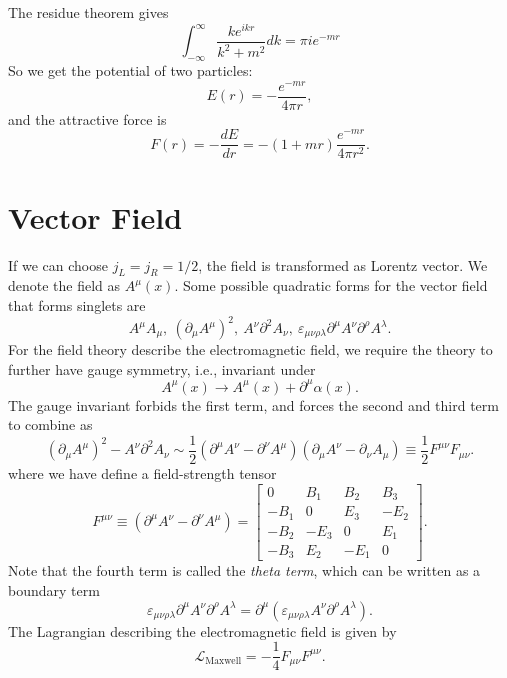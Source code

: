 The residue theorem gives
\begin{equation*}
	\int_{-\infty}^\infty \frac{k e^{ikr}}{k^2 +m^2} dk = \pi ie^{-mr}
\end{equation*}
So we get the potential of two particles:
\begin{equation}
	E(r) = -\frac{e^{-mr}}{4\pi r},
\end{equation}
and the attractive force is
\begin{equation}
	F(r) = -\frac{dE}{dr} = -(1+mr)\frac{e^{-mr}}{4\pi r^2}.
\end{equation}





\section{Vector Field}

If we can choose $j_L=j_R=1/2$, the field is transformed as Lorentz vector.
We denote the field as $A^\mu(x)$.
Some possible quadratic forms for the vector field that forms singlets are
\begin{equation*}
	A^\mu A_\mu,\ (\partial_\mu A^\mu)^2,\ A^\nu \partial^2 A_\nu,\ 
	\varepsilon_{\mu\nu\rho\lambda} \partial^\mu A^\nu \partial^\rho A^\lambda.
\end{equation*}
For the field theory describe the electromagnetic field, we require the theory to further have gauge symmetry, i.e., invariant under
\begin{equation}
	A^\mu(x) \rightarrow A^\mu(x) + \partial^\mu \alpha(x).
\end{equation}
The gauge invariant forbids the first term, and forces the second and third term to combine as
\begin{equation*}
	(\partial_\mu A^\mu)^2 - A^\nu \partial^2 A_\nu
	\sim \frac{1}{2}(\partial^\mu A^\nu - \partial^\nu A^\mu)(\partial_\mu A^\nu-\partial_\nu A_\mu)
	\equiv \frac{1}{2} F^{\mu\nu}F_{\mu\nu}.
\end{equation*}
where we have define a field-strength tensor
\begin{equation}
	F^{\mu\nu}\equiv (\partial^\mu A^\nu - \partial^\nu A^\mu)
	= \left[\begin{array}{cccc}
		0 & B_1 & B_2 & B_3 \\
		-B_1 & 0 & E_3 & -E_2 \\
		-B_2 & -E_3 & 0 & E_1 \\
		-B_3 & E_2 & -E_1 & 0
	\end{array} \right].
\end{equation}
Note that the fourth term is called the \textit{theta term}, which can be written as a boundary term
\begin{equation*}
	\varepsilon_{\mu\nu\rho\lambda} \partial^\mu A^\nu \partial^\rho A^\lambda
	= \partial^\mu (\varepsilon_{\mu\nu\rho\lambda} A^\nu \partial^\rho A^\lambda).
\end{equation*}
The Lagrangian describing the electromagnetic field is given by
\begin{equation}
	\mathcal{L}_{\mathrm{Maxwell}} = -\frac{1}{4}F_{\mu\nu}F^{\mu\nu}.
\end{equation}



